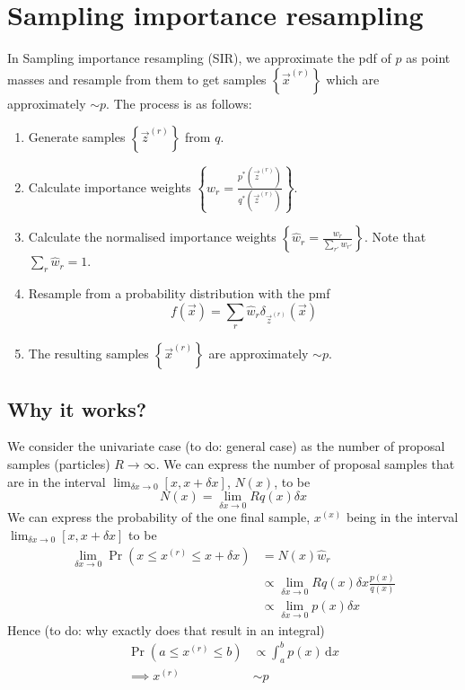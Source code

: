 \section{Sampling importance resampling}
In Sampling importance resampling (SIR), we approximate the pdf of $p$ as point masses and resample from them to get samples $\left\{\vec x^{(r)}\right\}$ which are approximately $\sim p$. The process is as follows:
\begin{enumerate}
    \item Generate samples $\left\{\vec z^{(r)}\right\}$ from $q$.
    \item Calculate importance weights $\left\{w_r = \frac{p^\ast(\vec z^{(r)})}{q^\ast(\vec z^{(r)})}\right\}$.
    \item Calculate the normalised importance weights $\left\{\hat w_r = \frac{w_r}{\sum_{r'} w_{r'}}\right\}$. Note that $\sum_r \hat w_r  = 1$.
    \item Resample from a probability distribution with the pmf
        \begin{equation}
            f(\vec x) = \sum_r \hat w_r \delta_{\vec z^{(r)}}(\vec x)
        \end{equation}
    \item The resulting samples $\left\{\vec x^{(r)}\right\}$ are approximately $\sim p$.
\end{enumerate}

\subsection{Why it works?}
We consider the univariate case (to do: general case) as the number of proposal samples (particles) $R \to \infty$. We can express the number of proposal samples that are in the interval $\lim_{\delta x \to 0}[x, x + \delta x]$, $N(x)$, to be
\begin{equation}
    N(x) = \lim_{\delta x \to 0} R q(x) \delta x
\end{equation}
We can express the probability of the one final sample, $x^{(x)}$ being in the interval $\lim_{\delta x \to 0}[x, x + \delta x]$ to be
\begin{align}
    \lim_{\delta x \to 0} \Pr(x \leq x^{(r)} \leq x + \delta x) &= N(x) \hat w_r \\
                                                                &\propto \lim_{\delta x \to 0} R q(x) \delta x \frac{p(x)}{q(x)} \\
                                                                &\propto \lim_{\delta x \to 0} p(x) \delta x
\end{align}
Hence (to do: why exactly does that result in an integral)
\begin{align}
    \Pr(a \leq x^{(r)} \leq b)  &\propto \int_a^b p(x) \,\mathrm d x \\
    \implies x^{(r)}            &\sim p
\end{align}
